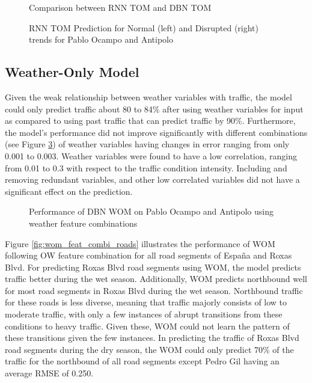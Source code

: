 \begin{figure}[h]
  \centering
  \captionsetup{justification=centering}
  \caption{Comparison between RNN TOM and DBN TOM}
  \label{fig:rnn_dbn_tom_pocampo}
\end{figure}

\begin{figure}[h]
  \centering
  \captionsetup{justification=centering}
  \caption{RNN TOM Prediction for Normal (left) and Disrupted (right) trends for Pablo Ocampo and Antipolo}
  \label{fig:RNN_TOM_normal_disrption_pocampo_antipolo_wet}
\end{figure}


\subsection{Weather-Only Model}
Given the weak relationship between weather variables with traffic, the model could only predict traffic about 80 to 84\% after using weather variables for input as compared to using past traffic that can predict traffic by 90\%. Furthermore, the model’s performance did not improve significantly with different combinations (see Figure \ref{fig:wom_diff_feat_combi}) of weather variables having changes in error ranging from only 0.001 to 0.003. Weather variables were found to have a low correlation, ranging from 0.01 to 0.3 with respect to the traffic condition intensity. Including and removing redundant variables, and other low correlated variables did not have a significant effect on the prediction. 

\begin{figure}[h]
  \centering
  \captionsetup{justification=centering}
  \caption{Performance of DBN WOM on Pablo Ocampo and Antipolo using weather feature combinations}
  \label{fig:wom_diff_feat_combi}
\end{figure}


Figure \ref{fig:wom_feat_combi_roads} illustrates the performance of WOM following OW feature combination for all road segments of España and Roxas Blvd. For predicting Roxas Blvd road segments using WOM, the model predicts traffic better during the wet season. Additionally, WOM predicts northbound well for most road segments in Roxas Blvd during the wet season. Northbound traffic for these roads is less diverse, meaning that traffic majorly consists of low to moderate traffic, with only a few instances of abrupt transitions from these conditions to heavy traffic. Given these, WOM could not learn the pattern of these transitions given the few instances. In predicting the traffic of Roxas Blvd road segments during the dry season, the WOM could only predict 70\% of the traffic for the northbound of all road segments except Pedro Gil having an average RMSE of 0.250. 

